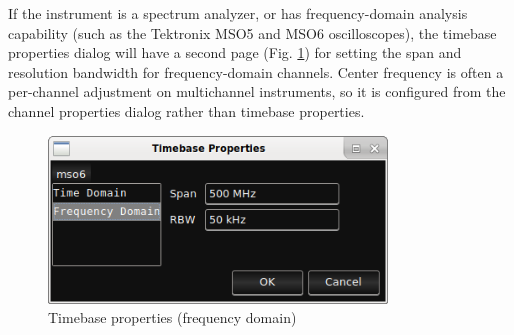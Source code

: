 If the instrument is a spectrum analyzer, or has frequency-domain analysis capability (such as the Tektronix MSO5 and
MSO6 oscilloscopes), the timebase properties dialog will have a second page (Fig. \ref{timebase-properties-freq}) for
setting the span and resolution bandwidth for frequency-domain channels. Center frequency is often a per-channel
adjustment on multichannel instruments, so it is configured from the channel properties dialog rather than timebase
properties.

\begin{figure}[h]
\centering
\includegraphics[width=9cm]{images/timebase-properties-freq.png}
\caption{Timebase properties (frequency domain)}
\label{timebase-properties-freq}
\end{figure}
